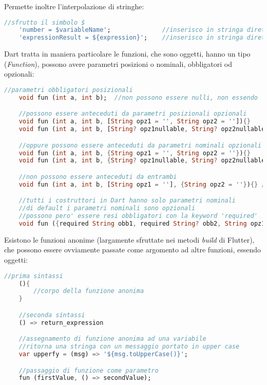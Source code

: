 Permette inoltre l'interpolazione di stringhe:
\begin{lstlisting}[language=dart, firstnumber=1,caption={Dart interpolazone stringhe}]
    //sfrutto il simbolo $
    'number = $variableName';              //inserisco in stringa direttamente una variabile
    'expressionResult = ${expression}';    //inserisco in stringa direttamente un'espressione
\end{lstlisting}

Dart tratta in maniera particolare le funzioni, che sono oggetti, hanno un tipo (\textit{Function}), possono avere parametri posizioni o nominali, obbligatori od opzionali: 
\begin{lstlisting}[language=dart, firstnumber=1,caption={Dart parametri funzioni}]
    //parametri obbligatori posizionali
    void fun (int a, int b);  //non possono essere nulli, non essendo 'int? a'

    //possono essere anteceduti da parametri posizionali opzionali
    void fun (int a, int b, [String opz1 = '', String opz2 = '']){}
    void fun (int a, int b, [String? opz1nullable, String? opz2nullable]){}

    //oppure possono essere anteceduti da parametri nominali opzionali
    void fun (int a, int b, {String opz1 = '', String opz2 = ''}){}
    void fun (int a, int b, {String? opz1nullable, String? opz2nullable}){}

    //non possono essere anteceduti da entrambi
    void fun (int a, int b, [String opz1 = ''], {String opz2 = ''}){} //compile error

    //tutti i costruttori in Dart hanno solo parametri nominali
    //di default i parametri nominali sono opzionali
    //possono pero' essere resi obbligatori con la keyword 'required'
    void fun ({required String obb1, required String? obb2, String opz1 = ''}){}
\end{lstlisting}

Esistono le funzioni anonime (largamente sfruttate nei metodi \textit{build} di Flutter), che possono essere ovviamente passate come argomento ad altre funzioni, essendo oggetti:
\begin{lstlisting}[language=dart, firstnumber=1,caption={Dart funzioni anonime}]
    //prima sintassi
    (){
        //corpo della funzione anonima
    } 

    //seconda sintassi
    () => return_expression

    //assegnamento di funzione anonima ad una variabile
    //ritorna una stringa con un messaggio portato in upper case
    var upperfy = (msg) => '${msg.toUpperCase()}';

    //passaggio di funzione come parametro
    fun (firstValue, () => secondValue);
\end{lstlisting}

